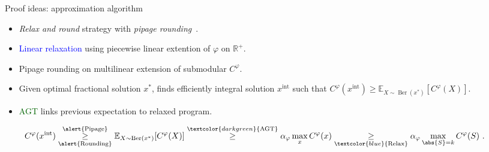 \documentclass{beamer}
\theoremstyle{definition}
\theoremstyle{remark}
\DeclareMathOperator{\Ber}{\text{Ber}}
\begin{document}
\begin{frame}{Proof ideas: approximation algorithm}
  \begin{itemize}
  \item \emph{Relax and round} strategy with \emph{pipage rounding}~\cite{AS04, Vondrak07}.\pause
    \bigskip
  \item \textcolor{blue}{Linear relaxation} using piecewise linear extention of $\varphi$ on $\mathbb{R}^+$.
    \bigskip
  \item \alert{Pipage rounding} on multilinear extension of submodular $C^{\varphi}$.
  \item Given optimal fractional solution $x^*$, finds efficiently integral solution $x^{\text{int}}$ such that $C^{\varphi}(x^{\text{int}}) \geq \mathbb{E}_{X \sim \Ber(x^*)}[C^{\varphi}(X)]$.
    \bigskip

  \item \textcolor{darkgreen}{AGT} links previous expectation to relaxed program.
  \end{itemize}

  \pause
  \begin{align*}
    \hspace*{-0.7cm} C^{\varphi}(x^{\text{int}}) \underset{\alert{\text{Rounding}}}{\overset{\alert{\text{Pipage}}}{\geq}} \mathbb{E}_{X \sim \Ber(x^*)}[C^{\varphi}(X)]  \overset{\textcolor{darkgreen}{\text{AGT}}}{\geq} \alpha_{\varphi} \max_x  C^{\varphi}(x) \underset{\textcolor{blue}{\text{Relax}}}{\geq} \alpha_{\varphi} \max_{\abs{S} = k} C^{\varphi}(S)\ .
  \end{align*}
\end{frame}
\end{document}
